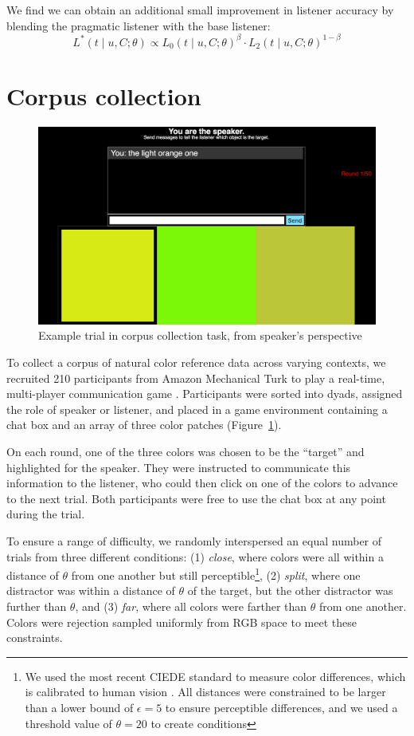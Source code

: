 \documentclass[11pt,letterpaper]{article}
\newcommand{\Listener}{L}
\newcommand{\utt}{u}
\newcommand{\context}{C}
\newcommand{\target}{t}
\renewcommand{\|}{\mid}
\newcommand{\figref}[1]{Figure~\ref{#1}}
\begin{document}
We find we can obtain an additional small improvement in listener accuracy
by blending the pragmatic listener with the base listener:
\[\Listener^{*}(\target \| \utt, \context; \theta) \propto {\Listener_0}(\target \| \utt, \context; \theta)^{\beta} \cdot \Listener_2(\target \| \utt, \context; \theta)^{1-\beta}\]

\section{Corpus collection}

\begin{figure}
\includegraphics[scale = .2]{figures/speakerView.png}
\caption{Example trial in corpus collection task, from speaker's perspective}
\label{fig:taskScreenshot}
\end{figure}

To collect a corpus of natural color reference data across varying contexts, we recruited 210 participants from Amazon Mechanical Turk to play a real-time, multi-player communication game \cite{Hawkins15_RealTimeWebExperiments}. Participants were sorted into dyads, assigned the role of speaker or listener, and placed in a game environment containing a chat box and an array of three color patches (\figref{fig:taskScreenshot}).

On each round, one of the three colors was chosen to be the ``target'' and highlighted for the speaker. They were instructed to communicate this information to the listener, who could then click on one of the colors to advance to the next trial. Both participants were free to use the chat box at any point during the trial. 

To ensure a range of difficulty, we randomly interspersed an equal number of trials from three different conditions: (1) \emph{close}, where colors were all within a distance of $\theta$ from one another but still perceptible\footnote{We used the most recent CIEDE standard to measure color differences, which is calibrated to human vision \cite{SharmaWuDalal05_DeltaE}. All distances were constrained to be larger than a lower bound of $\epsilon = 5$ to ensure perceptible differences, and we used a threshold value of $\theta = 20$ to create conditions}, (2) \emph{split}, where one distractor was within a distance of $\theta$ of the target, but the other distractor was further than $\theta$, and (3) \emph{far}, where all colors were farther than $\theta$ from one another. Colors were rejection sampled uniformly from RGB space to meet these constraints. 
\end{document}
